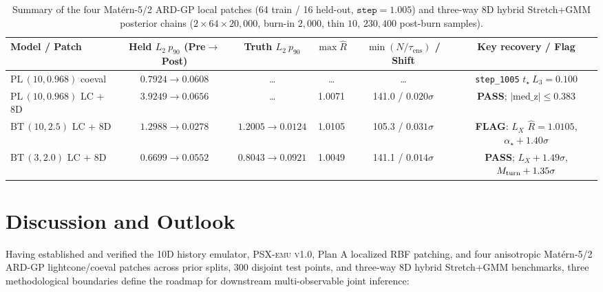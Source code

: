 \documentclass[aps,prd,reprint,superscriptaddress,nofootinbib,amsmath,amssymb,floatfix,longbibliography]{revtex4-2}
\begin{document}
\begin{table}[!tb]
\caption{Summary of the four Mat\'ern-5/2 ARD-GP local patches (64 train / 16 held-out, $\texttt{step}=1.005$) and three-way 8D hybrid Stretch+GMM posterior chains ($2\times 64\times 20{,}000$, burn-in $2{,}000$, thin $10$, $230{,}400$ post-burn samples).}
\label{tab:ard_gmm}
\scriptsize
\setlength{\tabcolsep}{1.8pt}
\begin{ruledtabular}
\begin{tabular}{lccccc}
Model / Patch & Held $L_2\ p_{90}$ (Pre$\to$Post) & Truth $L_2\ p_{90}$ & $\max \widehat{R}$ & $\min(N/\tau_{\mathrm{ens}})$ / Shift & Key recovery / Flag \\
\hline
$\mathrm{PL}\,(10, 0.968)$ coeval & $0.7924 \to 0.0608$ & \dots & \dots & \dots & \texttt{step\_1005} $t_\star\ L_3=0.100$ \\
$\mathrm{PL}\,(10, 0.968)$ LC + 8D & $3.9249 \to 0.0656$ & \dots & 1.0071 & 141.0 / $0.020\sigma$ & \textbf{PASS}; $|\mathrm{med\_z}|\le 0.383$ \\
$\mathrm{BT}\,(10, 2.5)$ LC + 8D & $1.2988 \to 0.0278$ & $1.2005 \to 0.0124$ & 1.0105 & 105.3 / $0.031\sigma$ & \textbf{FLAG}: $L_X$ $\widehat{R}=1.0105$, $\alpha_\star +1.40\sigma$ \\
$\mathrm{BT}\,(3, 2.0)$ LC + 8D & $0.6699 \to 0.0552$ & $0.8043 \to 0.0921$ & 1.0049 & 141.1 / $0.014\sigma$ & \textbf{PASS}; $L_X +1.49\sigma$, $M_{\rm turn} +1.35\sigma$ \\
\end{tabular}
\end{ruledtabular}
\end{table}

\section{Discussion and Outlook}\label{sec:discussion}

Having established and verified the 10D history emulator, \textsc{PSX-emu v1.0}, Plan A localized RBF patching, and four anisotropic Mat\'ern-5/2 ARD-GP lightcone/coeval patches across prior splits, 300 disjoint test points, and three-way 8D hybrid Stretch+GMM benchmarks, three methodological boundaries define the roadmap for downstream multi-observable joint inference:
\end{document}
